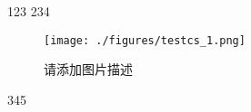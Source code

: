 
123
234

\begin{figure}[ht]
\centering
\texttt{[image: ./figures/testcs\_1.png]}
\caption{请添加图片描述} \label{testcs_fig1}
\end{figure}

345
